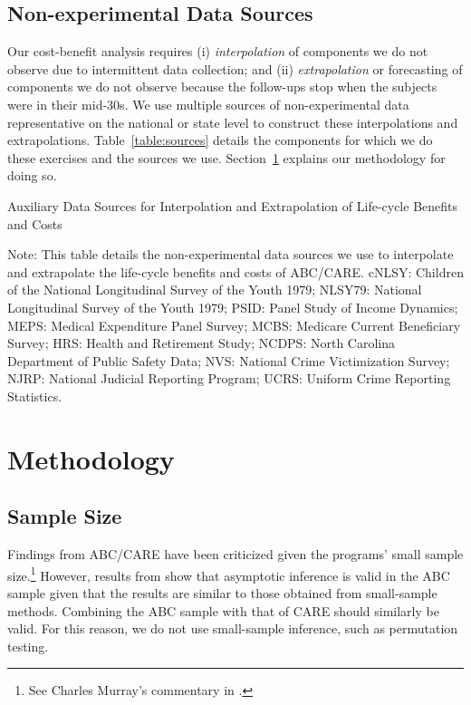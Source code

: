 \subsection{Non-experimental Data Sources}

Our cost-benefit analysis requires (i) \textit{interpolation} of components we do not observe due to intermittent data collection; and (ii) \textit{extrapolation} or forecasting of components we do not observe because the follow-ups stop when the subjects were in their mid-30s. We use multiple sources of non-experimental data representative on the national or state level to construct these interpolations and extrapolations. Table~\ref{table:sources} details the components for which we do these exercises and the sources we use. Section~\ref{section:methodology} explains our methodology for doing so.

\begin{table}[H]
\begin{threeparttable}
\caption{Auxiliary Data Sources for Interpolation and Extrapolation of Life-cycle Benefits and Costs} \label{table:sources}
\footnotesize

\begin{tablenotes}
\footnotesize
Note: This table details the non-experimental data sources we use to interpolate and extrapolate the life-cycle benefits and costs of ABC/CARE. cNLSY: Children of the National Longitudinal Survey of the Youth 1979; NLSY79: National Longitudinal Survey of the Youth 1979; PSID: Panel Study of Income Dynamics; MEPS: Medical Expenditure Panel Survey; MCBS: Medicare Current Beneficiary Survey; HRS: Health and Retirement Study; NCDPS: North Carolina Department of Public Safety Data; NVS: National Crime Victimization Survey; NJRP: National Judicial Reporting Program; UCRS: Uniform Crime Reporting Statistics.
\end{tablenotes}
\end{threeparttable}
\end{table}

\section{Methodology} \label{section:methodology}

\subsection{Sample Size}

Findings from ABC/CARE have been criticized given the programs' small sample size.\footnote{See Charles Murray's commentary in \citep
{Heckman_2013_BOOKGivingkidsfair}.} However, results from \citet{Campbell_Conti_etal_2014_EarlyChildhoodInvestments} show that asymptotic inference is valid in the ABC sample given that the results are similar to those obtained from small-sample methods. Combining the ABC sample with that of CARE should similarly be valid. For this reason, we do not use small-sample inference, such as permutation testing.

